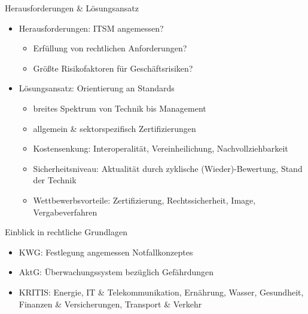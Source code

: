 \documentclass{cheatsheet}
\begin{document}
    \begin{sectionbox}{Herausforderungen \& Lösungsansatz}
        \begin{itemize}
            \item Herausforderungen: ITSM angemessen?
            \begin{itemize}
                \item Erfüllung von rechtlichen Anforderungen? 
                \item Größte Risikofaktoren für Geschäftsrisiken?
            \end{itemize}
            \item Lösungsansatz: Orientierung an Standards
            \begin{itemize}
                \item breites Spektrum von Technik bis Management
                \item allgemein \& sektorspezifisch Zertifizierungen 
                \item Kostensenkung: Interoperalität, Vereinheilichung, Nachvollziehbarkeit
                \item Sicherheitsniveau: Aktualität durch zyklische (Wieder)-Bewertung, Stand der Technik
                \item Wettbewerbsvorteile: Zertifizierung, Rechtssicherheit, Image, Vergabeverfahren
            \end{itemize}
        \end{itemize}
    \end{sectionbox}
    \begin{sectionbox}{Einblick in rechtliche Grundlagen}
        \begin{itemize}
            \item KWG: Festlegung angemessen Notfallkonzeptes
            \item AktG: Überwachungssystem bezüglich Gefährdungen
            \item KRITIS: Energie, IT \& Telekommunikation, Ernährung, Wasser, Gesundheit, Finanzen \& Versicherungen, Transport \& Verkehr
        \end{itemize}
    \end{sectionbox}
\end{document}
